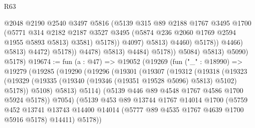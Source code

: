 \begin{lexlean}{R63}
\begin{coremodule}
                                            @2048
                                            @2190
                                            @2540
                                            @3497
                                            @5816
                                            (@5139
                                              @315
                                              @89
                                              @2188
                                              @1767
                                              @3495
                                              @1700
                                              (@5771
                                                @314
                                                @2182
                                                @2187
                                                @3527
                                                @3495
                                                (@5874 @236 @2060 @1769 @2594 @1955 @5893 @5813)
                                                @3581)
                                              @5178))
                                          @4097)
                                        @5813)
                                      @4460)
                                    @5178))
                                @4466)
                              @5813)
                            @4472)
                          @5178))
                      @4478)
                    @5813)
                  @4484)
                @5178))
            @5084)
          @5813)
        @5090)
      @5178)
@19674 := fun (a : @47) =>
  @19052
    (@19269
      (fun ("_" : @18990) =>
      @19279
        (@19285
          (@19290
            (@19296
              (@19301
                (@19307
                  (@19312
                    (@19318
                      (@19323
                        (@19329 (@19335 (@19340 (@19346 (@19351 @19528 @5096) @5813) @5102) @5178))
                        @5108)
                      @5813)
                    @5114)
                  (@5139 @446 @89 @4548 @1767 @4586 @1700 @5924 @5178))
                @7054)
              (@5139
                @453
                @89
                @13744
                @1767
                @14014
                @1700
                (@5759
                  @452
                  @13741
                  @13743
                  @14400
                  @14014
                  (@5777 @89 @4535 @1767 @4639 @1700 @5916 @5178)
                  @14411)
                @5178))

\end{coremodule}
\end{lexlean}
